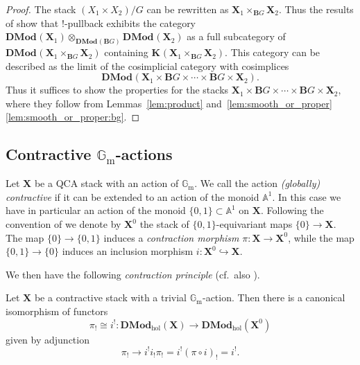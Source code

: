 \documentclass{oupau}
\theoremstyle{remark}
\newcommand\as[2][]{\mathbb A^{#2}_{#1}}    %
\newcommand\Gm{\mathbb{G}_{\mathrm{m}}}     %
\let\stack\mathbf                           %
\newcommand\cs{\stack{B}}                   %
\newcommand\cat{\mathbf}                    %
\newcommand\catDMod[2][]{\cat{DMod}_{#1}(#2)}   %
\newcommand\catDModHol[1]{\catDMod[\mathrm{hol}]{#1}}   %
\newcommand\catK[2][]{\cat{K}_{#1}(#2)}
\begin{document}
\begin{proof}
  The stack $(X_1 \times X_2)/G$ can be rewritten as $\stack X_1 \times_{\cs{G}} \stack X_2$.
  Thus the results of \cite[Section~5.2]{BenZviNadler:arXiv:CharacterTheoryOfAComplexGroup} show that $!$-pullback exhibits the category $\catDMod{\stack X_1} \otimes_{\catDMod{\cs{G}}} \catDMod{\stack X_2}$ as a full subcategory of $\catDMod{\stack X_1 \times_{\cs{G}} \stack X_2}$ containing $\catK{\stack X_1 \times_{\cs{G}} \stack X_2}$.
  This category can be described as the limit of the cosimplicial category with cosimplices
  \[
    \catDMod{\stack X_1 \times \cs{G} \times \dotsb \times \cs{G} \times \stack X_2}.
  \]
  Thus it suffices to show the properties for the stacks $\stack X_1 \times \cs{G} \times \dotsb \times \cs{G} \times \stack X_2$, where they follow from Lemmas~\ref{lem:product} and~\ref{lem:smooth_or_proper}\ref{lem:smooth_or_proper:bg}.
\end{proof}

\subsection{Contractive \texorpdfstring{$\Gm$}{Gm}-actions}

Let $\stack X$ be a QCA stack with an action of $\Gm$.
We call the action \emph{(globally) contractive} if it can be extended to an action of the monoid $\as 1$.
In this case we have in particular an action of the monoid $\{0,1\} \subset \as 1$ on $\stack X$.
Following the convention of \cite[Appendix~C]{DrinfeldGaitsgory:2015:CompactGenerationOfDModOnBunG} we denote by $\stack X^0$ the stack of $\{0,1\}$-equivariant maps $\{0\} \to \stack X$.
The map $\{0\} \to \{0,1\}$ induces a \emph{contraction morphism} $\pi\colon \stack X \to \stack X^0$, while the map $\{0,1\} \to \{0\}$ induces an inclusion morphism $i\colon \stack X^0 \hookrightarrow \stack X$.

We then have the following \emph{contraction principle} (cf.~also \cite[Proposition~3.2.2]{DrinfeldGaitsgory:2014:OnATheoremOfBraden}).

\begin{theorem}
    \label{thm:contraction_principle}%
    Let $\stack X$ be a contractive stack with a trivial $\Gm$-action.
    Then there is a canonical isomorphism of functors
    \[
        π_! \cong i^! \colon \catDModHol{\stack X} → \catDModHol{\stack X^0}
    \]
    given by adjunction
    \[
        π_! → i^! i_! π_!  = i^! (π ∘ i)_! = i^!.
    \]
\end{theorem}
\end{document}
